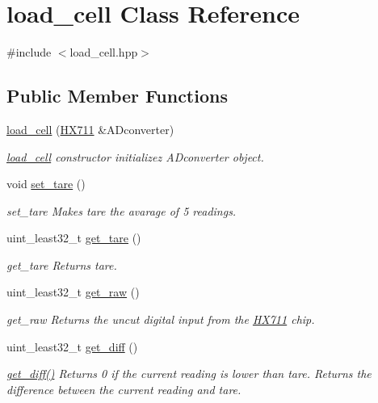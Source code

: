 \hypertarget{classload__cell}{}\section{load\+\_\+cell Class Reference}
\label{classload__cell}


{\ttfamily \#include $<$load\+\_\+cell.\+hpp$>$}

\subsection*{Public Member Functions}
\begin{DoxyCompactItemize}
\item 
\hyperlink{classload__cell_a7b0d68fac5e159c15a729e75bd39e646}{load\+\_\+cell} (\hyperlink{class_h_x711}{H\+X711} \&A\+Dconverter)
\begin{DoxyCompactList}\small\item\em \hyperlink{classload__cell}{load\+\_\+cell} constructor initializez A\+Dconverter object. \end{DoxyCompactList}\item 
void \hyperlink{classload__cell_a39e51be89a5ea75144696b203719d970}{set\+\_\+tare} ()
\begin{DoxyCompactList}\small\item\em set\+\_\+tare Makes tare the avarage of 5 readings. \end{DoxyCompactList}\item 
uint\+\_\+least32\+\_\+t \hyperlink{classload__cell_a98f7445e717e9e7e07926c4a11a726cf}{get\+\_\+tare} ()
\begin{DoxyCompactList}\small\item\em get\+\_\+tare Returns tare. \end{DoxyCompactList}\item 
uint\+\_\+least32\+\_\+t \hyperlink{classload__cell_ad399c39975e7a62d994566aff4171571}{get\+\_\+raw} ()
\begin{DoxyCompactList}\small\item\em get\+\_\+raw Returns the uncut digital input from the \hyperlink{class_h_x711}{H\+X711} chip. \end{DoxyCompactList}\item 
uint\+\_\+least32\+\_\+t \hyperlink{classload__cell_a2cc447989cf3757b51b0fdbc68ba2e58}{get\+\_\+diff} ()
\begin{DoxyCompactList}\small\item\em \hyperlink{classload__cell_a2cc447989cf3757b51b0fdbc68ba2e58}{get\+\_\+diff()} Returns 0 if the current reading is lower than tare. Returns the difference between the current reading and tare. \end{DoxyCompactList}\item 

\end{DoxyCompactItemize}
